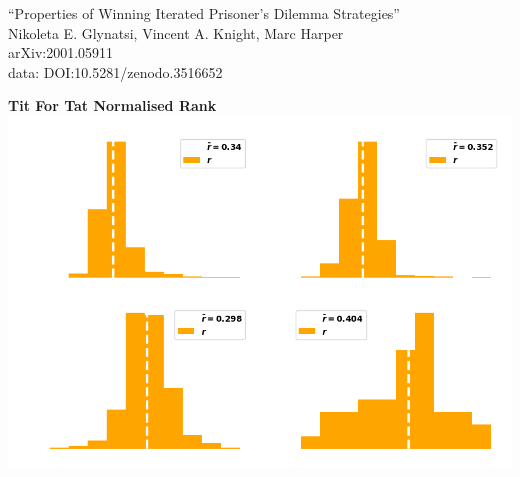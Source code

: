 \documentclass{beamer}
\begin{document}
\begin{frame}
    \begin{center}
        \large{``Properties of Winning Iterated Prisoner's Dilemma Strategies''} \\ \vspace{.5cm}
        \footnotesize{Nikoleta E. Glynatsi, Vincent A. Knight, Marc Harper} \\ \vspace{.5cm}
        \footnotesize{arXiv:2001.05911} \\ \vspace{.5cm}
        \footnotesize{data: DOI:10.5281/zenodo.3516652}
    \end{center}
\end{frame}

\begin{frame}
    \begin{center}
        \textbf{Tit For Tat Normalised Rank} \\ \vspace{1cm}
        \includegraphics[width=.8\textwidth]{static/tit_for_tat_r_distributions.png} 
    \end{center}
\end{frame}
\end{document}

